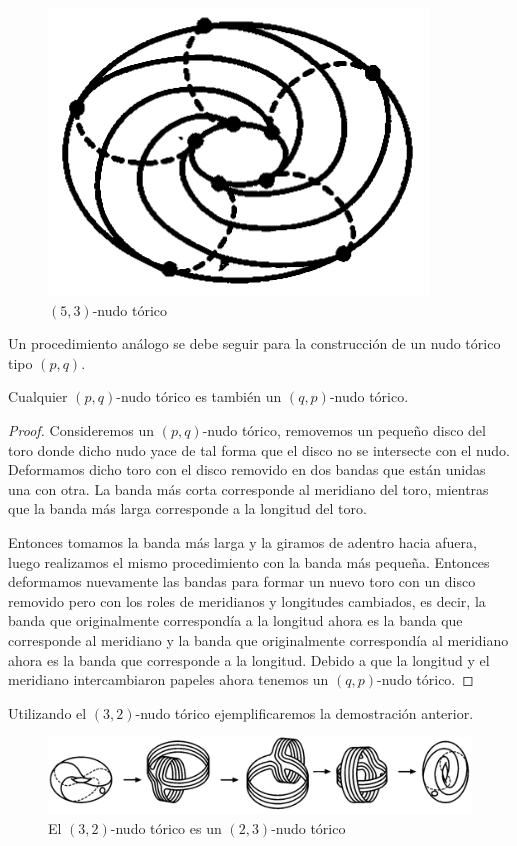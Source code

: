 \begin{figure}[ht]
	\centering
	\includegraphics[width=0.25\linewidth]{t5}
	\caption[$(5,3)$-nudo tórico]{$(5,3)$-nudo tórico}
	\label{fig:t5}
\end{figure}

Un procedimiento análogo se debe seguir para la construcción de un nudo tórico tipo $(p,q)$.

\begin{thm}\label{thm:t1} Cualquier $(p,q)$-nudo tórico es también un $(q,p)$-nudo tórico.
\end{thm}

\begin{proof}
	Consideremos un $(p,q)$-nudo tórico, removemos un pequeño disco del toro donde dicho nudo yace de tal forma que el disco no se intersecte con el nudo. Deformamos dicho toro con el disco removido en dos bandas que están unidas una con otra. La banda más corta corresponde al meridiano del toro, mientras que la banda más larga corresponde a la longitud del toro.
	
	Entonces tomamos la banda más larga y la giramos de adentro hacia afuera, luego realizamos el mismo procedimiento con la banda más pequeña. Entonces deformamos nuevamente las bandas para formar un nuevo toro con un disco removido pero con los roles de meridianos y longitudes cambiados, es decir, la banda que originalmente correspondía a la longitud ahora es la banda que corresponde al meridiano y la banda que originalmente correspondía al meridiano ahora es la banda que corresponde a la longitud. Debido a que la longitud y el meridiano intercambiaron papeles ahora tenemos un $(q,p)$-nudo tórico.
\end{proof}

Utilizando el $(3,2)$-nudo tórico ejemplificaremos la demostración anterior.

\begin{figure}[ht]
	\centering
	\includegraphics[width=0.8\linewidth]{t6}
	\caption[El $(3,2)$-nudo tórico es un $(2,3)$-nudo tórico]{El $(3,2)$-nudo tórico es un $(2,3)$-nudo tórico}
	\label{fig:t6}
\end{figure}

